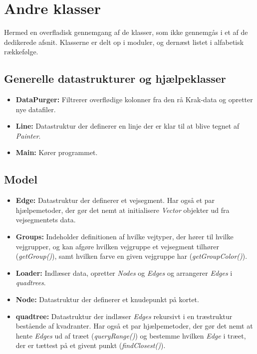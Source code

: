 \section{Andre klasser}

Hermed en overfladisk gennemgang af de klasser, som ikke gennemgås i et af de dedikerede afsnit. Klasserne er delt op i moduler, og dernæst listet i alfabetisk rækkefølge.

\subsection{Generelle datastrukturer og hjælpeklasser}

\begin{itemize}
	\item \textbf{DataPurger:} Filtrerer overflødige kolonner fra den rå Krak-data og opretter nye datafiler.
	\item \textbf{Line:} Datastruktur der definerer en linje der er klar til at blive tegnet af \emph{Painter}.
	\item \textbf{Main:} Kører programmet.
\end{itemize}

\subsection{Model}

\begin{itemize}
	\item \textbf{Edge:} Datastruktur der definerer et vejsegment. Har også et par hjælpemetoder, der gør det nemt at initialisere \emph{Vector} objekter ud fra vejsegmentets data.
	\item \textbf{Groups:} Indeholder definitionen af hvilke vejtyper, der hører til hvilke vejgrupper, og kan afgøre hvilken vejgruppe et vejsegment tilhører (\emph{getGroup()}), samt hvilken farve en given vejgruppe har (\emph{getGroupColor()}).
	\item \textbf{Loader:} Indlæser data, opretter \emph{Nodes} og \emph{Edges} og arrangerer \emph{Edges} i \emph{quadtrees}.
	\item \textbf{Node:} Datastruktur der definerer et knudepunkt på kortet.
	\item \textbf{quadtree:} Datastruktur der indlæser \emph{Edges} rekursivt i en træstruktur bestående af kvadranter. Har også et par hjælpemetoder, der gør det nemt at hente \emph{Edges} ud af træet (\emph{queryRange()}) og bestemme hvilken \emph{Edge} i træet, der er tættest på et givent punkt (\emph{findClosest()}).
\end{itemize}

